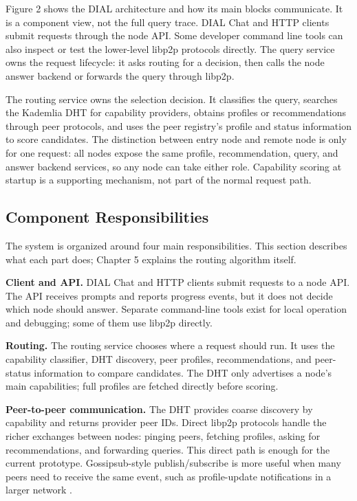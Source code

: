 Figure 2 shows the DIAL architecture and how its main blocks communicate. It
is a component view, not the full query trace. DIAL Chat and HTTP clients submit
requests through the node API. Some developer command line tools can also
inspect or test the lower-level libp2p protocols directly. The query service
owns the request lifecycle: it asks routing for a decision, then calls the node
answer backend or forwards the query through libp2p.

The routing service owns the selection decision. It classifies the query,
searches the Kademlia DHT for capability providers, obtains profiles or
recommendations through peer protocols, and uses the peer registry's profile
and status information to score candidates. The distinction between entry node
and remote node is only for one request: all nodes expose the same profile,
recommendation, query, and answer backend services, so any node can take either
role. Capability scoring at startup is a supporting mechanism, not part of the
normal request path.

\subsection{Component Responsibilities}

The system is organized around four main responsibilities. This section
describes what each part does; Chapter 5 explains the routing algorithm itself.

\textbf{Client and API.} DIAL Chat and HTTP clients submit requests to a node
API. The API receives prompts and reports progress events, but it does not
decide which node should answer. Separate command-line tools exist for local
operation and debugging; some of them use libp2p directly.

\textbf{Routing.} The routing service chooses where a request should run. It
uses the capability classifier, DHT discovery, peer profiles, recommendations,
and peer-status information to compare candidates. The DHT only advertises a
node's main capabilities; full profiles are fetched directly before scoring.

\textbf{Peer-to-peer communication.} The DHT provides coarse discovery by
capability and returns provider peer IDs. Direct libp2p protocols handle the
richer exchanges between nodes: pinging peers, fetching profiles, asking for
recommendations, and forwarding queries. This direct path is enough for the
current prototype. Gossipsub-style publish/subscribe is more useful when many
peers need to receive the same event, such as profile-update notifications in a
larger network \citep{libp2ppubsub}.

